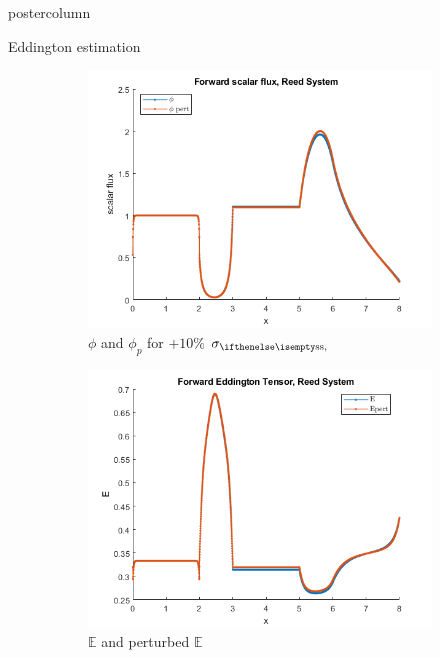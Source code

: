 \documentclass[xcolor={usenames,dvipsnames,svgnames,table}]{beamer}
\newcommand{\Edd}{\mathbb{E}}
\begin{document}
\begin{frame}
\begin{columns}
\begin{column}{.33\textwidth}
\begin{beamercolorbox}[center,wd=\textwidth]{postercolumn}
\begin{minipage}[T]{0.95\textwidth}
{\begin{block}{Eddington estimation}
\begin{figure}[H]
\label{Case113syst}
\centering
\begin{subfigure}{.33\textwidth}
  \centering
  \includegraphics[width=.98\linewidth]{posterfigures/7phi.png}
  \caption{$\phi$ and $\phi_p$ for $+10\%$ $\sigs$}
  \label{fig:sfig1}
\end{subfigure}%
\begin{subfigure}{.33\textwidth}
  \centering
  \includegraphics[width=.98\linewidth]{posterfigures/7E.png}
    \caption{$\Edd$ and perturbed $\Edd$}
  \label{fig:sfig2}
\end{subfigure}%
\begin{subfigure}{.33\textwidth}
  \centering

\end{subfigure}
\end{figure}
\end{block}}
\end{minipage}
\end{beamercolorbox}
\end{column}
\end{columns}
\end{frame}
\end{document}
